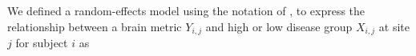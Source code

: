 We defined a random-effects model using the notation of \cite{Raudenbush2000}, to express the relationship between a brain metric $Y_{i,j}$ and high or low disease group $X_{i,j}$ at site $j$ for subject $i$ as %